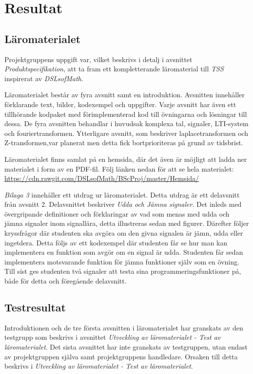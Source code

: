 \documentclass[]{article}
\begin{document}
\section{Resultat}


%

\subsection{Läromaterialet}
Projektgruppens uppgift var, vilket beskrivs i detalj i avsnittet \textit{Produktspecifikation}, att ta fram ett kompletterande
läromaterial till \textit{TSS} inspirerat av \textit{DSLsofMath}.

Läromaterialet består av fyra avsnitt samt en introduktion. Avsnitten innehåller förklarande text, bilder, kodexempel
och uppgifter. Varje avsnitt har även ett tillhörande kodpaket med förimplementerad kod till övningarna och lösningar
till dessa. De fyra avsnitten behandlar i huvudsak komplexa tal, signaler, LTI-system och fouriertransformen.
Ytterligare avsnitt, som beskriver laplacetransformen och Z-transformen,var planerat men detta fick bortprioriteras på
grund av tidsbrist.

Läromaterialet finns samlat på en hemsida, där det även är möjligt att ladda ner materialet i form av en PDF-fil. Följ
länken nedan för att se hela materialet:
\url{https://cdn.rawgit.com/DSLsofMath/BScProj/master/Hemsida/}

\textit{Bilaga 3} innehåller ett utdrag ur läromaterialet. Detta utdrag är ett delavsnitt från avsnitt 2. Delavsnittet
beskriver \textit{Udda och Jämna signaler}. Det inleds med övergripande definitioner och förklaringar av vad som menas med udda
och jämna signaler inom signallära, detta illustreras sedan med figurer. Därefter följer kryssfrågor där studenten ska
avgöra om den givna signalen är jämn, udda eller ingetdera. Detta följs av ett kodexempel där studenten får se hur man
kan implementera en funktion som avgör om en signal är udda. Studenten får sedan implementera motsvarande funktion för
jämna funktioner själv som en övning. Till sist ges studenten två signaler att testa sina programmeringsfunktioner på,
både för detta och föregående delavsnitt.


\subsection{Testresultat}
Introduktionen och de tre första avsnitten i läromaterialet har granskats av den testgrupp som beskrivs i avsnittet
\textit{Utveckling av läromaterialet - Test av läromaterialet}. Det sista avsnittet har inte granskats av testgruppen,
utan endast av projektgruppen själva samt projektgruppens handledare. Orsaken till detta beskrivs i
\textit{Utveckling av läromaterialet - Test av läromaterialet}.
\end{document}
